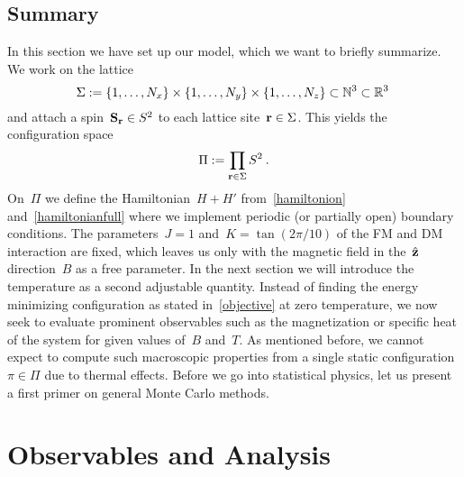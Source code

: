 \subsection{Summary}

In this section we have set up our model, which we want to briefly summarize. We
work on the lattice
%
\begin{equation}
  \Sigma := \{1,\dots,N_x\} \times \{1,\dots,N_y\} \times
  \{1,\dots,N_z\} \subset \mathbb{N}^3 \subset \mathbb{R}^3\:
\end{equation}
%
and attach a spin~$\mathbf{S}_{\mathbf{r}} \in S^2$ to each lattice site~$\mathbf{r} \in \Sigma$. This
yields the configuration space
%
\begin{equation}
  \Pi := \prod_{\mathbf{r} \in \Sigma} S^2\:.
\end{equation}
%
On~$\Pi$ we define the Hamiltonian~$H+H'$ from~\eqref{hamiltonion}
and~\eqref{hamiltonianfull} where we implement periodic (or partially open)
boundary conditions. The parameters~$J=1$ and~$K=\tan(2\pi / 10)$ of the FM and
DM interaction are fixed, which leaves us only with the magnetic field in
the~$\hat{\mathbf{z}}$ direction~$B$ as a free parameter. In the next section we will
introduce the temperature as a second adjustable quantity. Instead of finding
the energy minimizing configuration as stated in~\eqref{objective} at zero
temperature, we now seek to evaluate prominent observables such as the
magnetization or specific heat of the system for given values of~$B$ and~$T$. As
mentioned before, we cannot expect to compute such macroscopic properties from a
single static configuration~$\pi \in \Pi$ due to thermal effects. Before we go
into statistical physics, let us present a first primer on general Monte Carlo
methods.
%
\section{Observables and Analysis}\label{sec:analysis}
%

